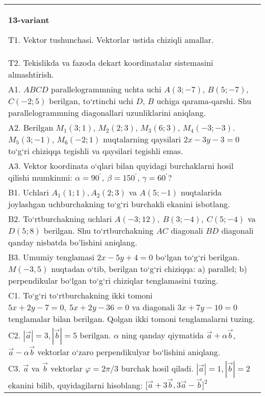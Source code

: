 \documentclass{article}
\begin{document}
\begin{tabular}{m{17cm}}
\textbf{13-variant}

T1. 
Vektor tushunchasi. Vektorlar ustida chiziqli amallar.
 \\
T2. 
Tekislikda va fazoda dekart koordinatalar sistemasini almashtirish.
 \\
A1. 
$ABCD$ parallelogrammning uchta uchi $A (3; -7) $,
$B (5; -7) $, $C (-2; 5) $ berilgan, to‘rtinchi uchi $D$,
$B$ uchiga qarama-qarshi. Shu parallelogrammning diagonallari
uzunliklarini aniqlang.
 \\
A2. 
Berilgan $M_1 (3; 1) $, $M_2 (2; 3) $, $M_3 (6; 3) $,
$M_4 (-3;-3) $. $M_5 (3;-1) $, $M_6 (-2; 1) $ nuqtalarning qaysilari
$2x-3y-3 = 0$ to‘g‘ri chiziqqa tegishli va qaysilari tegishli
emas.
 \\
A3. 
Vektor koordinata o‘qlari bilan quyidagi burchaklarni hosil qilishi
mumkinmi: $\alpha = 90^{{^\circ}},\ \beta = 150^{{^\circ}}$,
$\gamma = 60^{{^\circ}}?$
 \\
B1. 
Uchlari $A_1 (1; 1), A_2 (2; 3) $ va $A (5;-1) $
nuqtalarida joylashgan uchburchakning to‘g‘ri burchakli ekanini isbotlang.
 \\
B2. 
To‘rtburchakning uchlari
\(A (-3;12),\ B (3;-4),\ C (5;-4) \) va \(D (5;8) \) berilgan. Shu
to‘rtburchakning $AC$ diagonali $BD$ diagonali qanday
nisbatda bo'lishini aniqlang.
 \\
B3. 
Umumiy tenglamasi \(2x-5y+4=0\) bo‘lgan to‘g‘ri
berilgan. \(M (-3,5) \) nuqtadan o‘tib, berilgan to‘g‘ri chiziqqa: a) parallel;
b) perpendikular bo‘lgan to‘g‘ri chiziqlar tenglamasini tuzing.
 \\
C1. 
To‘g‘ri to‘rtburchakning ikki tomoni
\(5x+2y-7=0,\ 5x+2y-36=0\) va diagonali
\(3x+7y-10=0\) tenglamalar bilan berilgan. Qolgan ikki tomoni
tenglamalarni tuzing.
 \\
C2. 
$|\vec{a}| = 3,|\vec{b}| = 5$ berilgan. $\alpha$ ning qanday qiymatida $\vec{a} + \alpha\vec{b}$, $\vec{a} - \alpha\vec{b}$ vektorlar o‘zaro perpendikulyar bo‘lishini aniqlang.
 \\
C3. 
$\vec{a}$ va $\vec{b}$ vektorlar $\varphi = 2\pi/3$ burchak hosil qiladi. $|\vec{a}| = 1,|\vec{b}| = 2$ ekanini bilib, quyidagilarni hisoblang:
$\lbrack\overrightarrow{a} + 3\overrightarrow{b},3\overrightarrow{a} - \overrightarrow{b}\rbrack^{2}$
 \\

\end{tabular}
\vspace{1cm}
\end{document}
